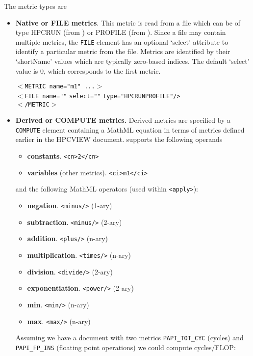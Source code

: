 \documentclass[english]{article}
\begin{document}
\begin{itemize}
The metric types are
  \begin{itemize}
  \item \textbf{Native or FILE metrics}.  This metric is read from a file which can be of type HPCRUN (from ) or PROFILE (from ). Since a file may contain multiple metrics, the \texttt{FILE} element has an optional `select' attribute to identify a particular metric from the file.  Metrics are identified by their `shortName' values which are typically zero-based indices.  The default `select' value is 0, which corresponds to the first metric.

  \texttt{$<$METRIC name="m1" ...$>$}\\
  \texttt{$<$FILE name="}\texttt{"}
    \texttt{select="}\texttt{"}
    \texttt{type="}\texttt{HPCRUN\Bar PROFILE}\texttt{"/>}\\
  \texttt{$<$/METRIC$>$}\\

  \item \textbf{Derived or COMPUTE metrics.} Derived metrics are specified by a \texttt{COMPUTE} element containing a MathML equation in terms of metrics defined earlier in the HPCVIEW document.   supports the following operands
  \begin{itemize}
    \item \textbf{constants}. \verb+<cn>2</cn>+
    \item \textbf{variables} (other metrics). \verb+<ci>m1</ci>+
  \end{itemize}
and the following MathML operators (used within \verb+<apply>+):
  \begin{itemize}
    \item \textbf{negation}. \verb+<minus/>+ (1-ary)
    \item \textbf{subtraction}. \verb+<minus/>+ (2-ary)
    \item \textbf{addition}. \verb+<plus/>+ (n-ary)
    \item \textbf{multiplication}. \verb+<times/>+ (n-ary)
    \item \textbf{division}. \verb+<divide/>+ (2-ary)
    \item \textbf{exponentiation}. \verb+<power/>+ (2-ary)
    \item \textbf{min}. \verb+<min/>+ (n-ary)
    \item \textbf{max}. \verb+<max/>+ (n-ary)
  \end{itemize}

  Assuming we have a document with two metrics \verb+PAPI_TOT_CYC+ (cycles) and \verb+PAPI_FP_INS+ (floating point operations) we could compute cycles/FLOP:


\end{itemize}
\end{itemize}
\end{document}
